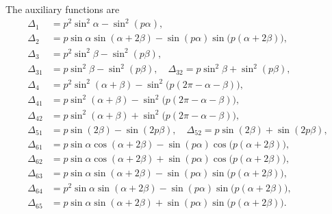 The auxiliary functions are
\begin{subequations}
\begin{align*}
	\Delta_{1}   &=p^{2}\sin^{2}\alpha-\sin^{2}(p\alpha),\\
	\Delta_{2}   &=p\sin\alpha\sin(\alpha+2\beta)
	-\sin(p\alpha)\sin\bigl(p(\alpha+2\beta)\bigr),\\
	\Delta_{3}   &=p^{2}\sin^{2}\beta-\sin^{2}(p\beta),\\
	\Delta_{31}  &=p\sin^{2}\beta-\sin^{2}(p\beta),\quad
	\Delta_{32}  =p\sin^{2}\beta+\sin^{2}(p\beta),\\
	\Delta_{4}   &=p^{2}\sin^{2}(\alpha+\beta)
	-\sin^{2}\bigl(p(2\pi-\alpha-\beta)\bigr),\\
	\Delta_{41}  &=p\sin^{2}(\alpha+\beta)
	-\sin^{2}\bigl(p(2\pi-\alpha-\beta)\bigr),\\
	\Delta_{42}  &=p\sin^{2}(\alpha+\beta)
	+\sin^{2}\bigl(p(2\pi-\alpha-\beta)\bigr),\\
	\Delta_{51}  &=p\sin(2\beta)-\sin(2p\beta),\quad
	\Delta_{52}  =p\sin(2\beta)+\sin(2p\beta),\\
	\Delta_{61}  &=p\sin\alpha\cos(\alpha+2\beta)
	-\sin(p\alpha)\cos\bigl(p(\alpha+2\beta)\bigr),\\
	\Delta_{62}  &=p\sin\alpha\cos(\alpha+2\beta)
	+\sin(p\alpha)\cos\bigl(p(\alpha+2\beta)\bigr),\\
	\Delta_{63}  &=p\sin\alpha\sin(\alpha+2\beta)
	-\sin(p\alpha)\sin\bigl(p(\alpha+2\beta)\bigr),\\
	\Delta_{64}  &=p^{2}\sin\alpha\sin(\alpha+2\beta)
	-\sin(p\alpha)\sin\bigl(p(\alpha+2\beta)\bigr),\\
	\Delta_{65}  &=p\sin\alpha\sin(\alpha+2\beta)
	+\sin(p\alpha)\sin\bigl(p(\alpha+2\beta)\bigr).
\end{align*}
\end{subequations}



